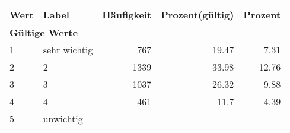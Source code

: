      \begin{longtable}{lXrrr}
     \toprule
     \textbf{Wert} & \textbf{Label} & \textbf{Häufigkeit} & \textbf{Prozent(gültig)} & \textbf{Prozent} \\
     \endhead
     \midrule
     \multicolumn{5}{l}{\textbf{Gültige Werte}}\\

     1 &
     \multicolumn{1}{X}{ sehr wichtig   } &


       \num{767} &
       \num[round-mode=places,round-precision=2]{19.47} &
         \num[round-mode=places,round-precision=2]{7.31} \\

     2 &
     \multicolumn{1}{X}{ 2   } &


       \num{1339} &
       \num[round-mode=places,round-precision=2]{33.98} &
         \num[round-mode=places,round-precision=2]{12.76} \\

     3 &
     \multicolumn{1}{X}{ 3   } &


       \num{1037} &
       \num[round-mode=places,round-precision=2]{26.32} &
         \num[round-mode=places,round-precision=2]{9.88} \\

     4 &
     \multicolumn{1}{X}{ 4   } &


       \num{461} &
       \num[round-mode=places,round-precision=2]{11.7} &
         \num[round-mode=places,round-precision=2]{4.39} \\

     5 &
     \multicolumn{1}{X}{ unwichtig   } &



\end{longtable}
